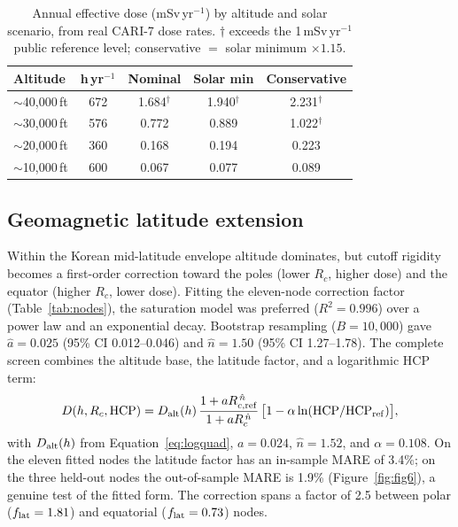 \documentclass[11pt,a4paper]{article}
\begin{document}
\begin{table}[htbp]
\centering
\caption{Annual effective dose (mSv\,yr$^{-1}$) by altitude and solar
scenario, from real CARI-7 dose rates. $\dagger$ exceeds the
1\,mSv\,yr$^{-1}$ public reference level; conservative $=$ solar
minimum $\times1.15$.}
\label{tab:annual}
\small
\begin{tabular}{lcccc}
\hline\hline
\textbf{Altitude} & \textbf{h\,yr$^{-1}$} & \textbf{Nominal} &
\textbf{Solar min} & \textbf{Conservative} \\
\hline
$\sim$40{,}000\,ft & 672 & 1.684$^\dagger$ & 1.940$^\dagger$ & 2.231$^\dagger$ \\
$\sim$30{,}000\,ft & 576 & 0.772 & 0.889 & 1.022$^\dagger$ \\
$\sim$20{,}000\,ft & 360 & 0.168 & 0.194 & 0.223 \\
$\sim$10{,}000\,ft & 600 & 0.067 & 0.077 & 0.089 \\
\hline\hline
\end{tabular}
\end{table}

\subsection{Geomagnetic latitude extension}
\label{sec:latext}
Within the Korean mid-latitude envelope altitude dominates, but cutoff
rigidity becomes a first-order correction toward the poles (lower $R_c$,
higher dose) and the equator (higher $R_c$, lower dose). Fitting the
eleven-node correction factor (Table~\ref{tab:nodes}), the saturation
model was preferred ($R^2=0.996$) over a power law and an exponential
decay. Bootstrap resampling ($B=10{,}000$) gave $\hat a=0.025$
(95\% CI 0.012--0.046) and $\hat n=1.50$ (95\% CI 1.27--1.78). The
complete screen combines the altitude base, the latitude factor, and a
logarithmic HCP term:
\begin{equation}
  D(h,R_c,\text{HCP}) = D_{\rm alt}(h)
  \,\frac{1+a R_{c,\rm ref}^{\,\hat n}}{1+a R_c^{\,\hat n}}
  \,\bigl[1-\alpha\ln(\text{HCP}/\text{HCP}_{\rm ref})\bigr],
  \label{eq:full}
\end{equation}
with $D_{\rm alt}(h)$ from Equation~\ref{eq:logquad}, $a=0.024$,
$\hat n=1.52$, and $\alpha=0.108$. On the eleven fitted nodes the latitude
factor has an in-sample MARE of 3.4\%; on the three held-out nodes the
out-of-sample MARE is 1.9\% (Figure~\ref{fig:fig6}), a genuine test of the
fitted form. The correction spans a factor of 2.5 between polar
($f_{\rm lat}=1.81$) and equatorial ($f_{\rm lat}=0.73$) nodes.
\end{document}
